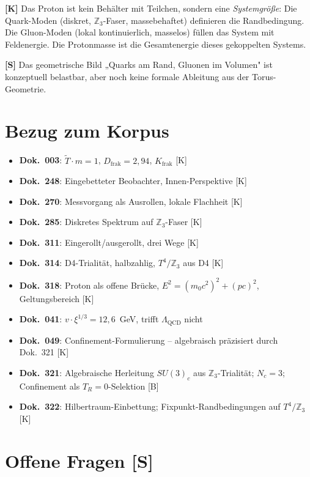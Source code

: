 \textbf{[K]} Das Proton ist kein Behälter mit Teilchen, sondern eine
\emph{Systemgröße}: Die Quark-Moden (diskret, $\mathbb{Z}_3$-Faser,
massebehaftet) definieren die Randbedingung. Die Gluon-Moden (lokal
kontinuierlich, masselos) füllen das System mit Feldenergie. Die
Protonmasse ist die Gesamtenergie dieses gekoppelten Systems.

\textbf{[S]} Das geometrische Bild „Quarks am Rand, Gluonen im
Volumen" ist konzeptuell belastbar, aber noch keine formale Ableitung
aus der Torus-Geometrie.

\section{Bezug zum Korpus}

\begin{itemize}
  \item \textbf{Dok.~003}: $\tilde{T}\cdot m=1$, $D_\text{frak}=2{,}94$,
    $K_\text{frak}$ [K]
  \item \textbf{Dok.~248}: Eingebetteter Beobachter, Innen-Perspektive [K]
  \item \textbf{Dok.~270}: Messvorgang als Ausrollen, lokale Flachheit [K]
  \item \textbf{Dok.~285}: Diskretes Spektrum auf $\mathbb{Z}_3$-Faser [K]
  \item \textbf{Dok.~311}: Eingerollt/ausgerollt, drei Wege [K]
  \item \textbf{Dok.~314}: D4-Trialität, halbzahlig, $T^4/\mathbb{Z}_3$
    aus D4 [K]
  \item \textbf{Dok.~318}: Proton als offene Brücke, $E^2=(m_0c^2)^2+(pc)^2$,
    Geltungsbereich [K]
  \item \textbf{Dok.~041}: $v\cdot\xi^{1/3} = 12{,}6$~GeV, trifft $\Lambda_\text{QCD}$ nicht
  \item \textbf{Dok.~049}: Confinement-Formulierung -- algebraisch
    präzisiert durch Dok.~321 [K]
  \item \textbf{Dok.~321}: Algebraische Herleitung $SU(3)_c$ aus
    $\mathbb{Z}_3$-Trialität; $N_c=3$; Confinement als $T_R=0$-Selektion
    [B]
  \item \textbf{Dok.~322}: Hilbertraum-Einbettung; Fixpunkt-Randbedingungen
    auf $T^4/\mathbb{Z}_3$ [K]
\end{itemize}

\section{Offene Fragen [S]}

